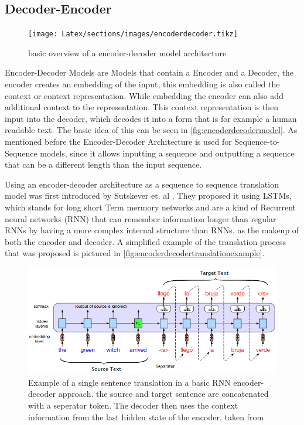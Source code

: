 \subsection{Decoder-Encoder}
\begin{figure}[]
    \centering%
    \texttt{[image: Latex/sections/images/encoderdecoder.tikz]}
    \caption{basic overview of a encoder-decoder model architecture}
    \label{fig:encoderdecodermodel}
\end{figure}

Encoder-Decoder Models are Models that contain a Encoder and a Decoder, the encoder creates an embedding of the input, this embedding is also called the context or context representation. While embedding the encoder can also add additional context to the representation. 
This context representation is then input into the decoder, which decodes it into a form that is for example a human readable text. 
The basic idea of this can be seen in \autoref{fig:encoderdecodermodel}.
As mentioned before the Encoder-Decoder Architecture is used for Sequence-to-Sequence models, since it allows inputting a sequence and outputting a sequence that can be a different length than the input sequence. \cite[chapter~8.7]{jm3}

Using an encoder-decoder architecture as a sequence to sequence translation model was first introduced by Sutskever et. al \cite{sutskever2014sequencesequencelearningneural}.
They proposed it using LSTMs, which stands for long short Term mermory networks and are a kind of Recurrent neural networks (RNN) that can remember information longer than regular RNNs by having a more complex internal structure than RNNs, as the makeup of both the encoder and decoder. 
A simplified example of the translation process that was proposed is pictured in \autoref{fig:encoderdecodertranslationexample}.
\begin{figure}
    \centering
    \includegraphics[width=0.5\linewidth]{Latex//sections//images/encoderdecodertranslation.png}
    \caption{Example of a single sentence translation in a basic RNN encoder-decoder approach. the source and target sentence are concatenated with a seperator token. The decoder then uses the context information from the last hidden state of the encoder. taken from \cite{jm3}} 
    \label{fig:encoderdecodertranslationexample}
\end{figure}


